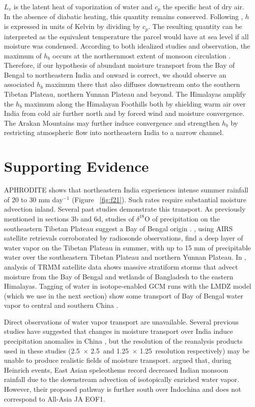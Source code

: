 	$L_v$ is the latent heat of vaporization of water and $c_p$ the specific heat of dry air. In the absence of diabatic heating, this quantity remains conserved. Following \cite{Boos2010}, $h$ is expressed in units of Kelvin by dividing by $c_p$. The resulting quantity can be interpreted as the equivalent temperature the parcel would have at sea level if all moisture was condensed. According to both idealized studies and observation, the maximum of $h_b$ occurs at the northernmost extent of monsoon circulation  \citep{Emanuel1995,Prive2007,Boos2010,Nie2010}. Therefore, if our hypothesis of abundant moisture transport from the Bay of Bengal to northeastern India and onward is correct, we should observe an associated $h_b$ maximum there that also diffuses downstream onto the southern Tibetan Plateau, northern Yunnan Plateau and beyond. The Himalayas amplify the $h_b$ maximum along the Himalayan Foothills both by shielding warm air over India from cold air further north \citep{Boos2010} and by forced wind and moisture convergence. The Arakan Mountains may further induce convergence and strengthen $h_b$ by restricting atmospheric flow into northeastern India to a narrow channel.

\section{Supporting Evidence}

	APHRODITE shows that northeastern India experiences intense summer rainfall of 20 to 30 mm day$^{-1}$ (Figure ~\ref{fig:f21}). Such rates require substantial moisture advection inland. Several past studies demonstrate this transport. As previously mentioned in sections 3b and 6d, studies of $\delta^{18}$O of precipitation on the southeastern Tibetan Plateau suggest a Bay of Bengal origin \citep{Yao2009,Gao2011,Yang2011}. \cite{Zhang2013}, using AIRS satellite retrievals corroborated by radiosonde observations, find a deep layer of water vapor on the Tibetan Plateau in summer, with up to 15 mm of precipitable water over the southeastern Tibetan Plateau and northern Yunnan Plateau. In \cite{Medina2010}, analysis of TRMM satellite data shows massive stratiform storms that advect moisture from the Bay of Bengal and wetlands of Bangladesh to the eastern Himalayas. Tagging of water in isotope-enabled GCM runs with the LMDZ model (which we use in the next section) show some transport of Bay of Bengal water vapor to central and southern China \citep{Yao2013}.
	
	Direct observations of water vapor transport are unavailable. Several previous studies have suggested that changes in moisture transport over India induce precipitation anomalies in China \citep{Feng2012,Cao2014}, but the resolution of the reanalysis products used in these studies (2.5\textdegree\ $\times$ 2.5\textdegree\ and 1.25\textdegree\ $\times$ 1.25\textdegree\ resolution respectively) may be unable to produce realistic fields of moisture transport. \cite{Pausata2011} argued that, during Heinrich events, East Asian speleothems record decreased Indian monsoon rainfall due to the downstream advection of isotopically enriched water vapor. However, their proposed pathway is further south over Indochina and does not correspond to All-Asia JA EOF1.	
		
